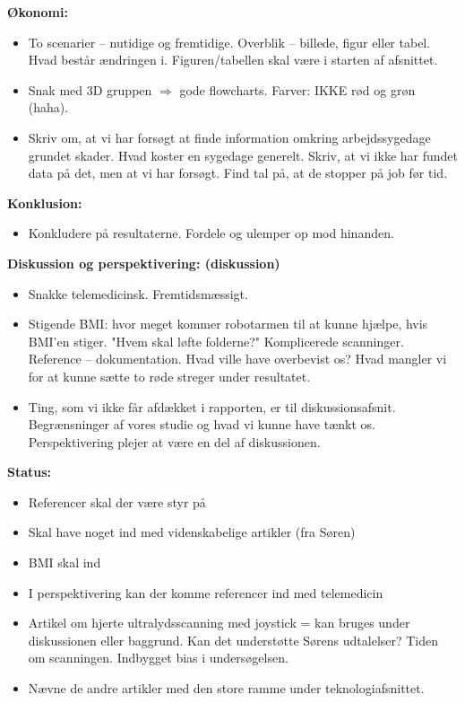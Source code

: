 \textbf{Økonomi:}
\begin{itemize}
\item To scenarier – nutidige og fremtidige. Overblik – billede, figur eller tabel. Hvad består ændringen i. Figuren/tabellen skal være i starten af afsnittet. 
\item Snak med 3D gruppen $\Rightarrow$ gode flowcharts. Farver: IKKE rød og grøn (haha). 
\item Skriv om, at vi har forsøgt at finde information omkring arbejdssygedage grundet skader. Hvad koster en sygedage generelt. Skriv, at vi ikke har fundet data på det, men at vi har forsøgt. Find tal på, at de stopper på job før tid.
\end{itemize}
\textbf{Konklusion:}
\begin{itemize}
\item Konkludere på resultaterne. Fordele og ulemper op mod hinanden. 
\end{itemize}
\textbf{Diskussion og perspektivering: (diskussion)}
\begin{itemize}
\item Snakke telemedicinsk. Fremtidsmæssigt. 
\item Stigende BMI: hvor meget kommer robotarmen til at kunne hjælpe, hvis BMI'en stiger. "Hvem skal løfte folderne?" Komplicerede scanninger. Reference – dokumentation. Hvad ville have overbevist os? Hvad mangler vi for at kunne sætte to røde streger under resultatet. 
\item Ting, som vi ikke får afdækket i rapporten, er til diskussionsafsnit. Begrænsninger af vores studie og hvad vi kunne have tænkt os. Perspektivering plejer at være en del af diskussionen. 
\end{itemize}
\textbf{Status:}
\begin{itemize}
\item Referencer skal der være styr på
\item Skal have noget ind med videnskabelige artikler (fra Søren)
\item BMI skal ind 
\item I perspektivering kan der komme referencer ind med telemedicin 
\item Artikel om hjerte ultralydsscanning med joystick = kan bruges under diskussionen eller baggrund. Kan det understøtte Sørens udtalelser? Tiden om scanningen. Indbygget bias i undersøgelsen. 
\item Nævne de andre artikler med den store ramme under teknologiafsnittet. 
\end{itemize}
\newpage


